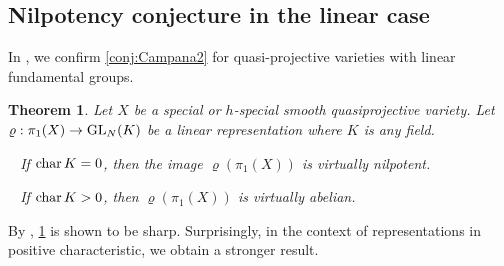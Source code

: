 \documentclass[english]{amsproc}
\theoremstyle{plain}
\newtheorem{thm}{Theorem}[section]
\theoremstyle{definition}
\theoremstyle{remark}
\theoremstyle{plain}
\numberwithin{equation}{thm} %
\newcommand{\GL}{{\rm GL}}
\begin{document}
	\subsection{Nilpotency conjecture in the linear case}
	In \cite{CDY25b,DY23b}, we confirm \cref{conj:Campana2} for quasi-projective varieties with linear fundamental groups. 
	\begin{thm}\label{thm:CDY}
		Let $X$ be a special or $h$-special smooth quasiprojective variety. Let  $\varrho:\pi_1(X)\to \GL_{N}(K)$ be a linear representation where $K$ is any field.  
		\begin{thmlist}
			\item  \label{VN} {\rm  \cite[Theorem A]{CDY22}\ } If ${\rm char}\, K=0$, then  the image $\varrho(\pi_1(X))$ is virtually nilpotent.  
			\item \label{VR:positive}   {\rm \cite[Theorem G]{DY23b}\ }   If ${\rm char}\, K>0$, then $\varrho(\pi_1(X))$ is virtually abelian.   
		\end{thmlist}  
	\end{thm}
	By  , \cref{thm:CDY} is shown to be sharp. Surprisingly, in the context of representations in positive characteristic,   we   obtain a stronger result.     
	
\end{document}
